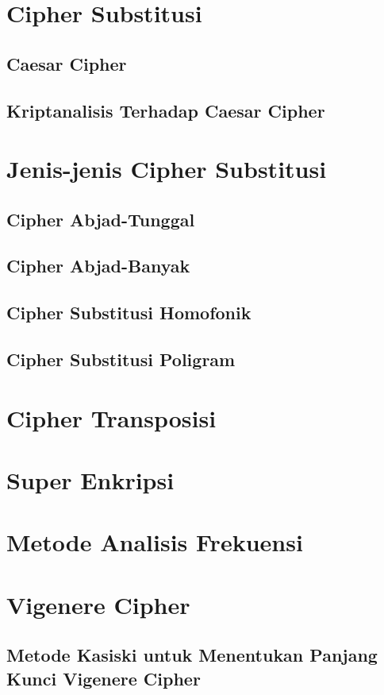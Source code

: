 \documentclass{book}
\begin{document}
    \section{Cipher Substitusi}
        \subsection{Caesar Cipher}
        \subsection{Kriptanalisis Terhadap Caesar Cipher}
    \section{Jenis-jenis Cipher Substitusi}
         \subsection{Cipher Abjad-Tunggal}
         \subsection{Cipher Abjad-Banyak}
         \subsection{Cipher Substitusi Homofonik}
         \subsection{Cipher Substitusi Poligram}         
    \section{Cipher Transposisi}
    \section{Super Enkripsi}
    \section{Metode Analisis Frekuensi}
    \section{Vigenere Cipher}
        \subsection{Metode Kasiski untuk Menentukan Panjang Kunci Vigenere Cipher}
\end{document}
